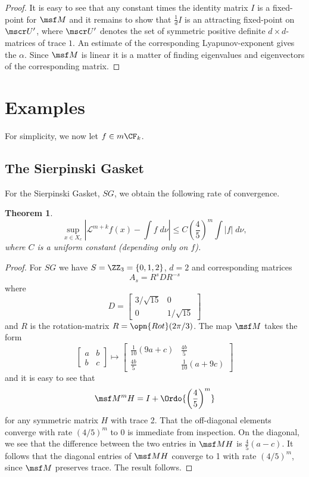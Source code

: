 \documentclass[11pt]{scrartcl}
\theoremstyle{plain} %
\newtheorem{thm}{Theorem}%
\theoremstyle{definition}
\begin{document}
\begin{proof}
It is easy to see that any constant times the identity matrix $I$ is a fixed-point for
$\msf M$ and it remains to show that $\frac 1dI$ is an attracting
fixed-point on $\mscr U'$, where $\mscr U'$ denotes the set of symmetric
positive definite $d\times d$-matrices of trace $1$. An estimate
of the corresponding Lyapunov-exponent gives the $\alpha$. Since $\msf
M$ is linear it is a matter of finding eigenvalues and
eigenvectors of the corresponding matrix.
\end{proof}

\section{Examples}
For simplicity, we now let $f\in m \CF_k$.
\subsection{The Sierpinski Gasket}
For the Sierpinski Gasket, $SG$, we obtain the following rate of convergence.
\begin{thm}
$$\sup_{x\in X_c} |{\mathcal L}^{m+k} f(x)-\int f\; d\nu|\leq C\left(\frac{4}{5}\right)^m\int |f|\; d\nu,$$
where $C$ is a uniform constant (depending only on $f$).
\end{thm}

\begin{proof}
For $SG$ we have $S=\ZZ_3=\{0,1,2\}$, $d=2$ and corresponding matrices 
$$ A_s = R^s D R^{-s} $$
where 
$$ D = \begin{bmatrix} 3/\sqrt{15} & 0 \\ 0 & 1/\sqrt{15} \end{bmatrix} $$
and $R$ is the rotation-matrix $R=\opn{Rot}(2\pi/3)$. The map $\msf M$
takes the form 
$$
\begin{bmatrix} a & b \\ b & c \end{bmatrix}
\mapsto
\begin{bmatrix}
 \frac{1}{10} (9 a+c) & \frac{4 b}{5} \\
 \frac{4 b}{5} & \frac{1}{10} (a+9 c)
\end{bmatrix}
$$
and it is easy to see that 
$$
\msf M^m H = I + \Ordo{\left(\frac {4}{5}\right)^m}
$$
for any symmetric matrix $H$ with trace 2. That the off-diagonal elements converge with rate $(4/5)^m$ to $0$ is immediate from inspection. On the diagonal, we see that the difference between the two entries in $\msf M H$ is $\frac45 (a-c)$. It follows that the diagonal entries of $\msf M H$ converge to 1 with rate $(4/5)^m$, since $\msf M$ preserves trace. The result follows.
\end{proof}
\end{document}
